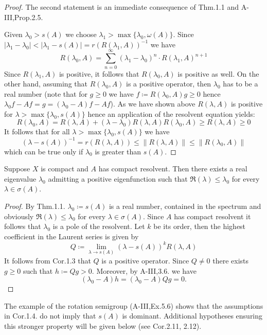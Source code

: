 \begin{proof}
	The second statement is an immediate consequence of Thm.1.1 and A-III,Prop.2.5.
	
	Given $\lambda_0 > s(A)$ we choose $\lambda_1 > \max\{\lambda_0,\omega(A)\}$.
	Since $|\lambda_1 - \lambda_0| < |\lambda_1 - s(A)| = r(R(\lambda_1,A))^{-1}$ we have
	\begin{equation}\label{eq:b3-1.10}
		R(\lambda_0,A) = \sum_{n=0}^{\infty} (\lambda_1 - \lambda_0)^n \cdot R(\lambda_1,A)^{n+1}
	\end{equation}
	Since $R(\lambda_1,A)$ is positive, it follows that $R(\lambda_0,A)$ is positive as well.
	On the other hand, assuming that $R(\lambda_0,A)$ is a positive operator, then $\lambda_0$ has to be a real number (note that for $g \geq 0$ we have $f \coloneqq R(\lambda_0,A)g \geq 0$ hence $\lambda_0f - Af = g = (\lambda_0 - A)f - Af$).
	As we have shown above $R(\lambda,A)$ is positive for $\lambda > \max\{\lambda_0,s(A)\}$ hence an application of the resolvent equation yields:
	\begin{equation}\label{eq:b3-1.11}
		R(\lambda_0,A) = R(\lambda,A) + (\lambda - \lambda_0)R(\lambda,A)R(\lambda_0,A) \geq R(\lambda,A) \geq 0
	\end{equation}
%
%
	It follows that for all $\lambda > \max\{\lambda_{0},s(A)\}$ we have
	\begin{equation}\label{eq:b3-1.12}
		(\lambda - s(A))^{-1} = r(R(\lambda,A)) \leq \|R(\lambda,A)\| \leq \|R(\lambda_{0},A)\|
	\end{equation}
	which can be true only if $\lambda_{0}$ is greater than $s(A)$.
\end{proof}
\begin{corollary}\label{cor:b3-1.4}
Suppose $X$ is compact and $A$ has compact resolvent.	
	Then there exists a real eigenvalue $\lambda_{0}$ admitting a positive eigenfunction such that 
	$\Re(\lambda) \leq \lambda_{0}$ for every $\lambda \in \sigma(A)$.
\end{corollary}
\begin{proof}
	By Thm.1.1. $\lambda_{0} \coloneqq s(A)$ is a real number, contained in the spectrum and obviously $\Re(\lambda) \leq \lambda_{0}$ for every $\lambda \in \sigma(A)$.
	Since $A$ has compact resolvent it follows that $\lambda_{0}$ is a pole of the resolvent.
	Let $k$ be its order, then the highest coefficient in the Laurent series is given by
	\begin{equation}\label{eq:b3-1.13}
		Q \coloneqq \lim_{\lambda \to s(A)} (\lambda - s(A))^{k}R(\lambda,A)
	\end{equation}
It follows from Cor.1.3 that $Q$ is a positive operator.
Since $Q \neq 0$ there exists $g \geq 0$ such that $h \coloneqq Qg > 0$.
Moreover, by A-III,3.6. we have 
%
\[
	 (\lambda_{0} - A)h = (\lambda_{0} - A)Qg = 0 .
\]
%
\end{proof}
The example of the rotation semigroup (A-III,Ex.5.6) shows that the assumptions in Cor.1.4. do not imply that $s(A)$ is dominant.
Additional hypotheses ensuring this stronger property will be given below (see Cor.2.11, 2.12).

